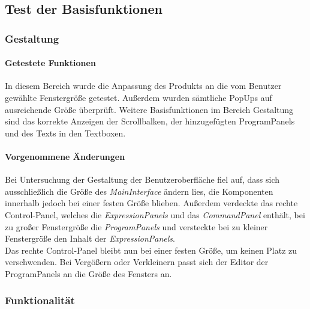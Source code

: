 \documentclass[parskip=full]{scrartcl}
\begin{document}
\subsection{Test der Basisfunktionen}
\subsubsection{Gestaltung}
\paragraph{Getestete Funktionen}
In diesem Bereich wurde die Anpassung des Produkts an die vom Benutzer gewählte Fenstergröße getestet. Außerdem wurden sämtliche PopUps auf ausreichende Größe überprüft.
Weitere Basisfunktionen im Bereich Gestaltung sind das korrekte Anzeigen der Scrollbalken, der hinzugefügten ProgramPanels und des Texts in den Textboxen.
\paragraph{Vorgenommene Änderungen}
Bei Untersuchung der Gestaltung der Benutzeroberfläche  fiel auf, dass sich ausschließlich die Größe des \textit{MainInterface} ändern lies, die Komponenten innerhalb jedoch bei einer festen Größe blieben. Außerdem verdeckte das rechte Control-Panel, welches die \textit{ExpressionPanels} und das \textit{CommandPanel} enthält, bei zu großer Fenstergröße die \textit{ProgramPanels} und versteckte bei zu kleiner Fenstergröße den Inhalt der \textit{ExpressionPanels}.\\
Das rechte Control-Panel bleibt nun bei einer festen Größe, um keinen Platz zu verschwenden. Bei Vergößern oder Verkleinern passt sich der Editor der ProgramPanels an die Größe des Fensters an.
\subsubsection{Funktionalität}
\end{document}
